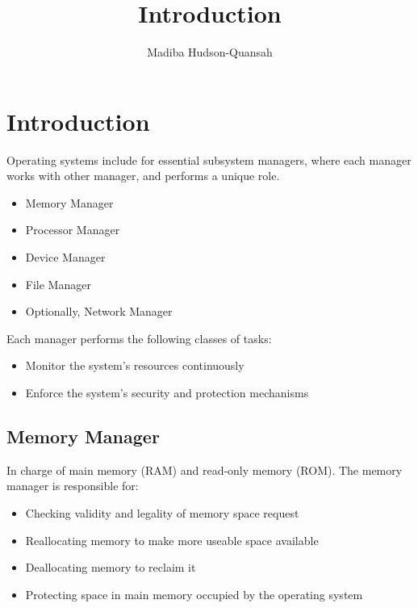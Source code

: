 \documentclass[12pt letter]{report}
\title{\Huge{Introduction}}
\author{\huge{Madiba Hudson-Quansah}}
\date{}
\begin{document}
\maketitle
\newpage
{}
\tableofcontents
\pagebreak

\chapter{Introduction}



Operating systems include for essential subsystem managers, where each manager works with other manager, and performs
a unique role.

\begin{itemize}
  \item Memory Manager
  \item Processor Manager
  \item  Device Manager
  \item File Manager
  \item Optionally, Network Manager
\end{itemize}

Each manager performs the following classes of tasks:
\begin{itemize}
  \item Monitor the system's resources continuously
  \item Enforce the system's security and protection mechanisms
\end{itemize}


\section{Memory Manager}

In charge of main memory (RAM) and read-only memory (ROM).
The memory manager is responsible for:
\begin{itemize}
  \item Checking validity and legality of memory space request
  \item Reallocating memory to make more useable space available
  \item Deallocating memory to reclaim it
  \item Protecting space in main memory occupied by the operating system
\end{itemize}
\end{document}
